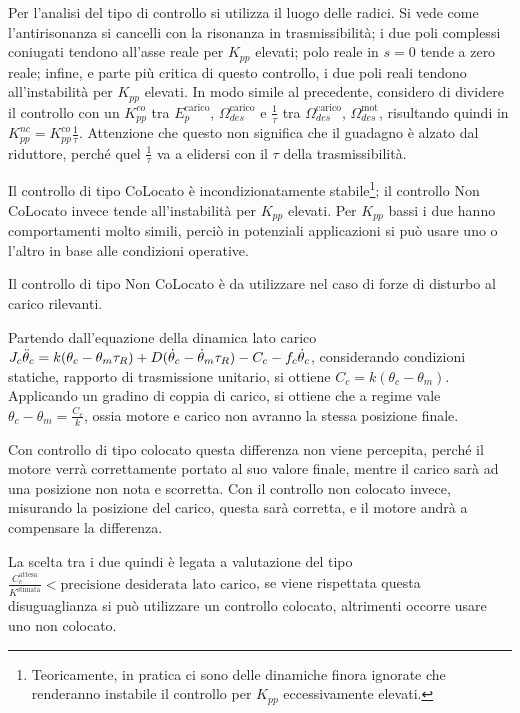 Per l'analisi del tipo di controllo si utilizza il luogo delle radici. Si vede come l'antirisonanza si cancelli con la risonanza in trasmissibilità; i due poli complessi coniugati tendono all'asse reale per \(K_{pp}\) elevati; polo reale in \(s=0\) tende a zero reale; infine, e parte più critica di questo controllo, i due poli reali tendono all'instabilità per \(K_{pp}\) elevati.
In modo simile al precedente, considero di dividere il controllo con un \(K_{pp}^{co}\) tra \(E_p^\text{carico}\), \(\Omega_{des}^\text{carico}\) e \(\frac{1}{\tau}\) tra \(\Omega_{des}^\text{carico}\), \(\Omega_{des}^\text{mot}\), risultando quindi in \(K_{pp}^{nc} = K_{pp}^{co} \frac{1}{\tau}\).
Attenzione che questo non significa che il guadagno è alzato dal riduttore, perché quel \(\frac{1}{\tau}\) va a elidersi con il \(\tau\) della trasmissibilità.

Il controllo di tipo CoLocato è incondizionatamente stabile\footnote{Teoricamente, in pratica ci sono delle dinamiche finora ignorate che renderanno instabile il controllo per \(K_{pp}\) eccessivamente elevati.}; il controllo Non CoLocato invece tende all'instabilità per \(K_{pp}\) elevati.
Per \(K_{pp}\) bassi i due hanno comportamenti molto simili, perciò in potenziali applicazioni si può usare uno o l'altro in base alle condizioni operative.

Il controllo di tipo Non CoLocato è da utilizzare nel caso di forze di disturbo al carico rilevanti. 

Partendo dall'equazione della dinamica lato carico \(J_c \Ddot{\theta}_c = k(\theta_c - \theta_m \tau_R) + D(\dot{\theta}_c - \dot{\theta}_m\tau_R) - C_c - f_c\dot{\theta}_c\), considerando condizioni statiche, rapporto di trasmissione unitario, si ottiene \(C_c = k(\theta_c - \theta_m)\).
Applicando un gradino di coppia di carico, si ottiene che a regime vale \(\theta_c - \theta_m = \frac{C_c}{k}\), ossia motore e carico non avranno la stessa posizione finale.

Con controllo di tipo colocato questa differenza non viene percepita, perché il motore verrà correttamente portato al suo valore finale, mentre il carico sarà ad una posizione non nota e scorretta.
Con il controllo non colocato invece, misurando la posizione del carico, questa sarà corretta, e il motore andrà a compensare la differenza.

La scelta tra i due quindi è legata a valutazione del tipo \(\frac{C_c^\text{attesa}}{K^\text{stimata}} < \text{precisione desiderata lato carico}\), se viene rispettata questa disuguaglianza si può utilizzare un controllo colocato, altrimenti occorre usare uno non colocato.

